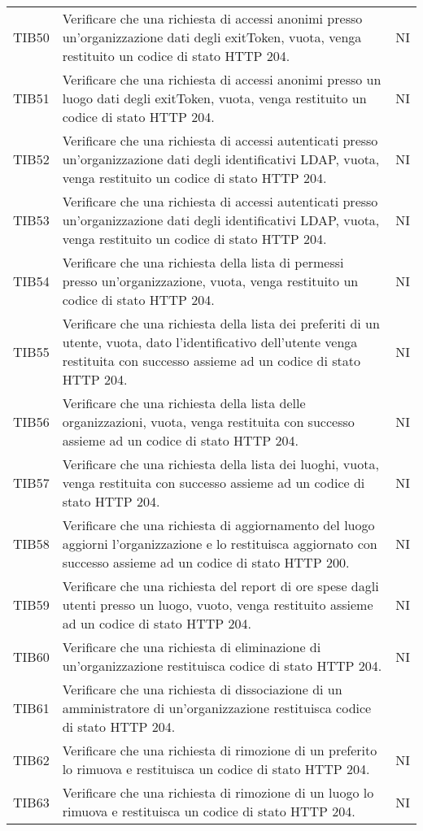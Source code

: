 {\begin{longtable}{ c C{13cm} C{1cm}}
TIB50 & Verificare che una richiesta di accessi anonimi presso un'organizzazione dati degli exitToken, vuota, venga restituito un codice di stato HTTP 204. & NI \\
TIB51 & Verificare che una richiesta di accessi anonimi presso un luogo dati degli exitToken, vuota, venga restituito un codice di stato HTTP 204. & NI \\
TIB52 & Verificare che una richiesta di accessi autenticati presso un'organizzazione dati degli identificativi LDAP, vuota, venga restituito un codice di stato HTTP 204. & NI \\
TIB53 & Verificare che una richiesta di accessi autenticati presso un'organizzazione dati degli identificativi LDAP, vuota, venga restituito un codice di stato HTTP 204. & NI \\
TIB54 & Verificare che una richiesta della lista di permessi presso un'organizzazione, vuota, venga restituito un codice di stato HTTP 204. & NI \\
TIB55 & Verificare che una richiesta della lista dei preferiti di un utente, vuota, dato l'identificativo dell'utente venga restituita con successo assieme ad un codice di stato HTTP 204. & NI \\
TIB56 & Verificare che una richiesta della lista delle organizzazioni, vuota, venga restituita con successo assieme ad un codice di stato HTTP 204. & NI \\
TIB57 & Verificare che una richiesta della lista dei luoghi, vuota, venga restituita con successo assieme ad un codice di stato HTTP 204. & NI \\
TIB58 & Verificare che una richiesta di aggiornamento del luogo aggiorni l'organizzazione e lo restituisca aggiornato con successo assieme ad un codice di stato HTTP 200. & NI \\
TIB59 & Verificare che una richiesta del report di ore spese dagli utenti presso un luogo, vuoto, venga restituito assieme ad un codice di stato HTTP 204. & NI \\
TIB60 & Verificare che una richiesta di eliminazione di un'organizzazione restituisca codice di stato HTTP 204. & NI \\
TIB61 & Verificare che una richiesta di dissociazione di un amministratore di un'organizzazione restituisca codice di stato HTTP 204. \\
TIB62 & Verificare che una richiesta di rimozione di un preferito lo rimuova e restituisca un codice di stato HTTP 204. & NI \\
TIB63 & Verificare che una richiesta di rimozione di un luogo lo rimuova e restituisca un codice di stato HTTP 204. & NI \\

\end{longtable}}
